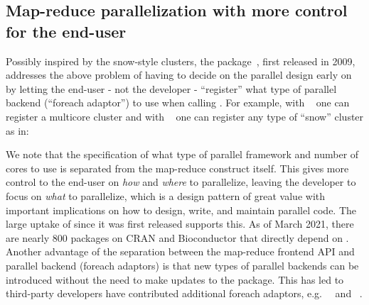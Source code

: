 \subsection{Map-reduce parallelization with more control for the end-user}
\label{map-reduce-parallelization-with-more-control-for-the-end-user}

Possibly inspired by the snow-style clusters, the 
package~\citep{CRAN:foreach,Kane_etal_2013}, first released in 2009,
addresses the above problem of having to decide on the parallel design
early on by letting the end-user - not the developer - ``register''
what type of parallel backend (``foreach adaptor'') to use when
calling . For example, with
~\citep{CRAN:doMC} one can register a multicore cluster and
with ~\citep{CRAN:doParallel} one can register any
type of ``snow'' cluster as in:
%
%
We note that the specification of what type of parallel framework and
number of cores to use is separated from the 
map-reduce construct itself. This gives more control to the end-user
on
\emph{how} and \emph{where} to parallelize, leaving the developer to
focus on \emph{what} to parallelize, which is a design pattern of
great value with important implications on how to design, write, and
maintain parallel code. The large uptake of  since it was
first released supports this. As of March 2021, there are nearly 800
packages on CRAN and Bioconductor that directly depend on
. Another advantage of the separation between the
map-reduce frontend API and parallel backend (foreach adaptors) is
that new types of parallel backends can be introduced without the need
to make updates to the  package. This has led to
third-party developers have contributed additional foreach adaptors,
e.g.\ ~\citep{CRAN:doMPI} and
~\citep{CRAN:doRedis}.

